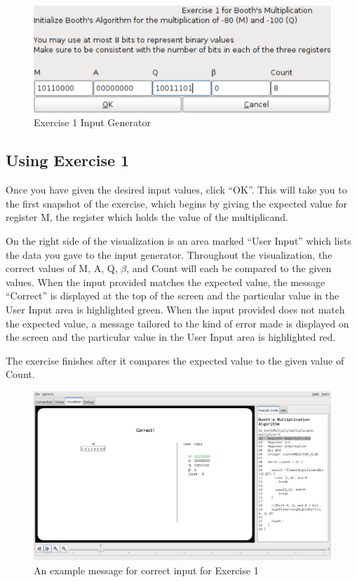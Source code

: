 \documentclass{article}
\begin{document}
\begin{figure}[h]
\centering
\includegraphics[scale=0.4]{ex1ingen.pdf}
\caption{Exercise 1 Input Generator}
\end{figure}

\subsection{Using Exercise 1}
Once you have given the desired input values, click ``OK''.
This will take you to the first snapshot of the exercise, which begins by giving the expected value for register M, the register which holds the value of the multiplicand.

On the right side of the visualization is an area marked ``User Input'' which lists the data you gave to the input generator.
Throughout the visualization, the correct values of M, A, Q, $\beta$, and Count will each be compared to the given values.
When the input provided matches the expected value, the message ``Correct'' is displayed at the top of the screen and the particular value in the User Input area is highlighted green.
When the input provided does not match the expected value, a message tailored to the kind of error made is displayed on the screen and the particular value in the User Input area is highlighted red.

The exercise finishes after it compares the expected value to the given value of Count.
\pagebreak

\begin{figure}[h]
\centering
\includegraphics[scale=0.4]{ex1correct.pdf}
\caption{An example message for correct input for Exercise 1}
\end{figure}
\end{document}
